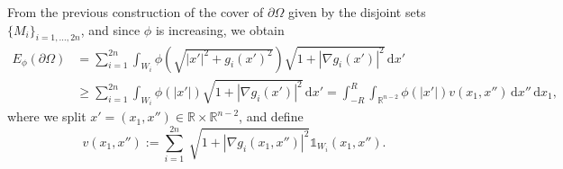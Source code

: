 \documentclass[10pt,leqno]{amsart}
\makeatletter
\newcommand{\R}[0]{\mathbb{R}}
\newcommand{\p}{\partial}
\newcommand{\dd}{\, \mathrm{d}}
\newcommand{\one}{\mathds{1}}
\numberwithin{Theorem}{section}
\theoremstyle{definition}
\theoremstyle{remark}
\numberwithin{equation}{section}
\numberwithin{equation}{section}
\newenvironment{customproof}[1]{%
  \par\pushQED{\qed}%
  \normalfont\topsep6pt \trivlist
  \item[\hskip\labelsep\itshape
    Proof of #1\@addpunct{.}]\ignorespaces
}{%
  \popQED\endtrivlist\@endpefalse
}
\makeatother
\begin{document}
\begin{customproof}{Lemma \ref{lm:bound_on_max_radius_decreasing}}
From the previous construction  of the cover of $\p \Omega$ given by the disjoint sets $\{M_i\}_{i=1,\dots,2n}$,  and since $\phi$ is increasing, we obtain 
\begin{equation} \label{eq:bound_Ephi_going_down}
\begin{aligned}
 E_{\phi}(\p \Omega)&=\sum_{i=1}^{2n}\int_{W_i} \phi\left(\sqrt{|x'|^2+g_i(x')^2}\right)\sqrt{1+|\nabla g_i(x')|^2} \dd x'\\
 &\geq \sum_{i=1}^{2n}\int_{W_i} \phi\left(|x'|\right)\sqrt{1+|\nabla g_i(x')|^2} \dd x' = \int_{-R}^{ R} \int_{\R^{n-2}}\phi\left(|x'|\right) v(x_1, x'') \dd x'' \dd x_1,
\end{aligned}
\end{equation}
where we split $x' = (x_1, x'') \in  \R \times \R^{n-2}$, and define
 \[
v(x_1, x'') := \sum_{i=1}^{2n} \ \sqrt{1+|\nabla g_i(x_1, x'')|^2} \one_{{W}_i}(x_1, x'').
 \]


\end{customproof}
\end{document}
